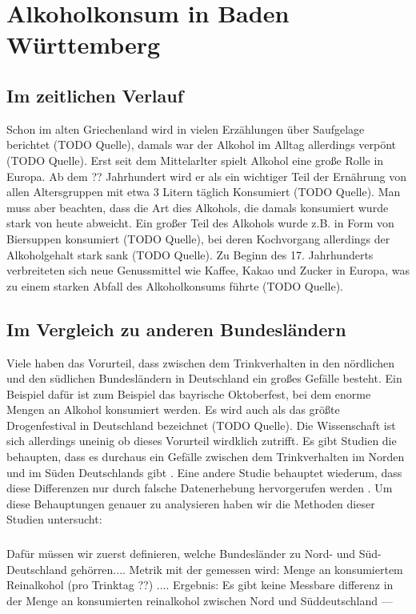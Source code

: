 \documentclass[12pt]{article}
\begin{document}
\section{Alkoholkonsum in Baden Württemberg}



\subsection{Im zeitlichen Verlauf}
Schon im alten Griechenland wird in vielen Erzählungen über Saufgelage berichtet (TODO Quelle), damals war der Alkohol im Alltag allerdings verpönt (TODO Quelle). Erst seit dem Mittelarlter spielt Alkohol eine große Rolle in Europa. Ab dem ?? Jahrhundert wird er als ein wichtiger Teil der Ernährung von allen Altersgruppen mit etwa 3 Litern täglich Konsumiert (TODO Quelle). Man muss aber beachten, dass die Art dies Alkohols, die damals konsumiert wurde stark von heute abweicht. Ein großer Teil des Alkohols wurde z.B. in Form von Biersuppen konsumiert (TODO Quelle), bei deren Kochvorgang allerdings der Alkoholgehalt stark sank (TODO Quelle). Zu Beginn des 17. Jahrhunderts verbreiteten sich neue Genussmittel wie Kaffee, Kakao und Zucker in Europa, was zu einem starken Abfall des Alkoholkonsums führte (TODO Quelle). 

\subsection{Im Vergleich zu anderen Bundesländern}
Viele haben das Vorurteil, dass zwischen dem Trinkverhalten in den nördlichen und den südlichen Bundesländern in Deutschland ein großes Gefälle besteht. Ein Beispiel dafür ist zum Beispiel das bayrische Oktoberfest, bei dem enorme Mengen an Alkohol konsumiert werden. Es wird auch als das größte Drogenfestival in Deutschland bezeichnet (TODO Quelle). Die Wissenschaft ist sich allerdings uneinig ob dieses Vorurteil wirdklich zutrifft. Es gibt Studien die behaupten, dass es durchaus ein Gefälle zwischen dem Trinkverhalten im Norden und im Süden Deutschlands gibt \autocite{meyer_regionale_1998}. Eine andere Studie behauptet wiederum, dass diese Differenzen nur durch falsche Datenerhebung hervorgerufen werden \autocite{kraus_einfluss_2001}. Um diese Behauptungen genauer zu analysieren haben wir die Methoden dieser Studien untersucht: 
\subsubsection {}
Dafür müssen wir zuerst definieren, welche Bundesländer zu Nord- und Süd- Deutschland gehörren.... 
Metrik mit der gemessen wird: Menge an konsumiertem Reinalkohol (pro Trinktag ??)
....
Ergebnis: Es gibt keine Messbare differenz in der Menge an konsumierten reinalkohol zwischen Nord und Süddeutschland
---
\end{document}
